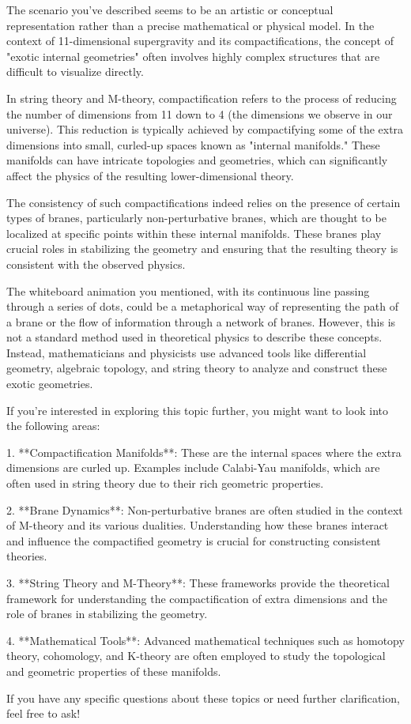 The scenario you've described seems to be an artistic or conceptual representation rather than a precise mathematical or physical model. In the context of 11-dimensional supergravity and its compactifications, the concept of "exotic internal geometries" often involves highly complex structures that are difficult to visualize directly.

In string theory and M-theory, compactification refers to the process of reducing the number of dimensions from 11 down to 4 (the dimensions we observe in our universe). This reduction is typically achieved by compactifying some of the extra dimensions into small, curled-up spaces known as "internal manifolds." These manifolds can have intricate topologies and geometries, which can significantly affect the physics of the resulting lower-dimensional theory.

The consistency of such compactifications indeed relies on the presence of certain types of branes, particularly non-perturbative branes, which are thought to be localized at specific points within these internal manifolds. These branes play crucial roles in stabilizing the geometry and ensuring that the resulting theory is consistent with the observed physics.

The whiteboard animation you mentioned, with its continuous line passing through a series of dots, could be a metaphorical way of representing the path of a brane or the flow of information through a network of branes. However, this is not a standard method used in theoretical physics to describe these concepts. Instead, mathematicians and physicists use advanced tools like differential geometry, algebraic topology, and string theory to analyze and construct these exotic geometries.

If you're interested in exploring this topic further, you might want to look into the following areas:

1. **Compactification Manifolds**: These are the internal spaces where the extra dimensions are curled up. Examples include Calabi-Yau manifolds, which are often used in string theory due to their rich geometric properties.
   
2. **Brane Dynamics**: Non-perturbative branes are often studied in the context of M-theory and its various dualities. Understanding how these branes interact and influence the compactified geometry is crucial for constructing consistent theories.

3. **String Theory and M-Theory**: These frameworks provide the theoretical framework for understanding the compactification of extra dimensions and the role of branes in stabilizing the geometry.

4. **Mathematical Tools**: Advanced mathematical techniques such as homotopy theory, cohomology, and K-theory are often employed to study the topological and geometric properties of these manifolds.

If you have any specific questions about these topics or need further clarification, feel free to ask!